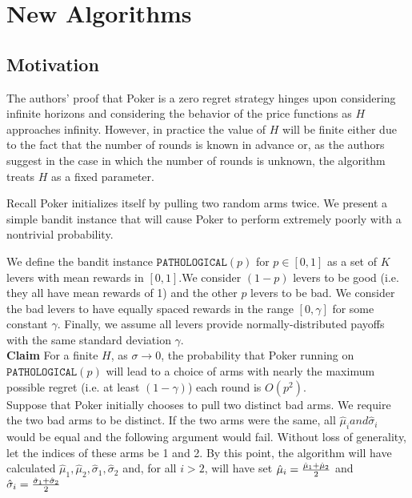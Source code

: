 \documentclass[12pt]{article}
\begin{document}
\section{New Algorithms}

\subsection{Motivation}

The authors' proof that Poker is a zero regret strategy hinges upon considering infinite horizons and considering the behavior of the price functions as $H$ approaches infinity. However, in practice the value of $H$ will be finite either due to the fact that the number of rounds is known in advance or, as the authors suggest in the case in which the number of rounds is unknown, the algorithm treats $H$ as a fixed parameter.

Recall Poker initializes itself by pulling two random arms twice. We present a simple bandit instance that will cause Poker to perform extremely poorly with a nontrivial probability.

We define the bandit instance $\texttt{PATHOLOGICAL}(p)$ for $p \in [0,1]$ as a set of $K$ levers with mean rewards in $[0,1]$.We consider $(1-p)$ levers to be good (i.e. they all have mean rewards of 1) and the other $p$ levers to be bad. We consider the bad levers to have equally spaced rewards in the range $[0,\gamma]$ for some constant $\gamma$. Finally, we assume all levers provide normally-distributed payoffs with the same standard deviation $\gamma$. \\

\noindent
\textbf{Claim} For a finite $H$, as $\sigma \rightarrow 0$, the probability that Poker running on $\texttt{PATHOLOGICAL}(p)$ will lead to a choice of arms with nearly the maximum possible regret (i.e. at least $(1-\gamma)$) each round is $O(p^{2})$. \\ 

Suppose that Poker initially chooses to pull two distinct bad arms. We require the two bad arms to be distinct. If the two arms were the same, all $\hat{\mu}_{i} and \hat{\sigma}_{i}$ would be equal and the following argument would fail. Without loss of generality, let the indices of these arms be 1 and 2. By this point, the algorithm will have calculated $\hat{\mu}_{1}, \hat{\mu}_{2}, \hat{\sigma}_{1},\hat{\sigma}_{2}$ and, for all $i > 2$, will have set $\hat{\mu}_{i}= {\hat{\mu}_{1}+\hat{\mu}_{2}\over 2}$ and $\hat{\sigma}_{i} = {\hat{\sigma}_{1}+\hat{\sigma}_{2}\over 2}$
\end{document}
